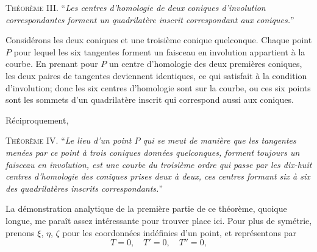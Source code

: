 \documentclass[12pt,a4paper]{article}
\begin{document}
\medskip
\textsc{Th\'eor\`eme III.} ``\textit{Les centres d'homologie de deux coniques d'involution correspondantes forment un quadrilat\`ere inscrit correspondant aux coniques.}''

Consid\'erons les deux coniques et une troisi\`eme conique quelconque. Chaque point $P$ pour lequel les six tangentes forment un faisceau en involution appartient \`a la courbe. En prenant pour $P$ un centre d'homologie des deux premi\`eres coniques, les deux paires de tangentes deviennent identiques, ce qui satisfait \`a la condition d'involution; donc les six centres d'homologie sont sur la courbe, ou ces six points sont les sommets d'un quadrilat\`ere inscrit qui correspond aussi aux coniques.

R\'eciproquement,

\medskip
\textsc{Th\'eor\`eme IV.} ``\textit{Le lieu d'un point $P$ qui se meut de mani\`ere que les tangentes men\'ees par ce point \`a trois coniques donn\'ees quelconques, forment toujours un faisceau en involution, est une courbe du troisi\`eme ordre qui passe par les dix-huit centres d'homologie des coniques prises deux \`a deux, ces centres formant six \`a six des quadrilat\`eres inscrits correspondants.}''

La d\'emonstration analytique de la premi\`ere partie de ce th\'eor\`eme, quoique longue, me para\^it assez int\'eressante pour trouver place ici. Pour plus de sym\'etrie, prenons $\xi$, $\eta$, $\zeta$ pour les coordonn\'ees ind\'efinies d'un point, et repr\'esentons par
\[
T = 0,\quad T' = 0,\quad T'' = 0,
\]

\newpage
\setcounter{page}{192}
\end{document}
